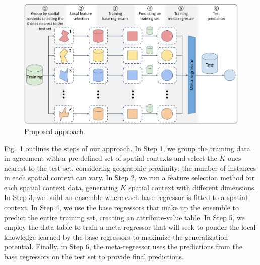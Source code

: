 \documentclass[runningheads]{llncs}
\begin{document}
\begin{figure}[!ht]
    \centering
    \includegraphics[width=0.94\linewidth]{approach.pdf}
    \caption{Proposed approach.}
    \label{fig:approach}
\end{figure}

Fig.~\ref{fig:approach} outlines the steps of our approach. In Step 1, we group the training data in agreement with a pre-defined set of spatial contexts and select the $K$ ones nearest to the test set, considering geographic proximity; the number of instances in each spatial context can vary. In Step 2, we run a feature selection method for each spatial context data, generating $K$ spatial context with different dimensions. In Step 3, we build an ensemble where each base regressor is fitted to a spatial context. In Step 4, we use the base regressors that make up the ensemble to predict the entire training set, creating an attribute-value table. In Step 5, we employ the data table to train a meta-regressor that will seek to ponder the local knowledge learned by the base regressors to maximize the generalization potential. Finally, in Step 6, the meta-regressor uses the predictions from the base regressors on the test set to provide final predictions.
\end{document}
